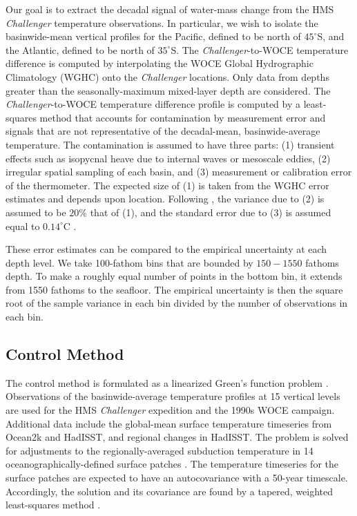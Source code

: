 \documentclass[12pt]{article}
\begin{document}
Our goal is to extract the decadal signal of water-mass change from
the HMS {\it Challenger} temperature observations. In particular, we
wish to isolate the basinwide-mean vertical profiles for the Pacific, defined to be north of $45^\circ$S, and the Atlantic, defined to be north of
$35^\circ$S. The {\it Challenger}-to-WOCE temperature difference is
computed by interpolating the WOCE Global Hydrographic Climatology
(WGHC)\cite{Gouretski-Koltermann-2004:WOCE} onto the {\it Challenger}
locations. Only data from depths greater than the seasonally-maximum mixed-layer depth are considered. The {\it Challenger}-to-WOCE temperature difference profile
is computed by a least-squares method that accounts for contamination
by measurement error and signals that are not representative of the
decadal-mean, basinwide-average temperature. The contamination is
assumed to have three parts: (1) transient effects such as isopycnal
heave due to internal waves or mesoscale eddies, (2) irregular spatial
sampling of each basin, and (3) measurement or calibration error of
the thermometer.  The expected size of (1) is taken from the WGHC
error estimates and depends upon location.  Following
\cite{Huang--2015:Heaving}, the variance due to (2) is assumed to be
$20\%$ that of (1), and the standard error due to (3) is assumed
equal to $0.14^{\circ}$C \cite{Roemmich-Gould-2012:135}.

These error estimates can be compared to the empirical uncertainty at each depth level. We take 100-fathom bins that are bounded by $150-1550$ fathoms depth. To make a roughly equal number of points in the bottom bin, it extends from 1550 fathoms to the seafloor. The empirical uncertainty is then the square root of the sample variance in each bin divided by the number of observations in each bin.

\subsection{Control Method}

The control method is formulated as a linearized Green's function
problem \cite{Gebbie--2012:Tracer}. Observations of the
basinwide-average temperature profiles at 15 vertical levels are used
for the HMS {\it Challenger} expedition and the 1990s WOCE campaign.
Additional data include the global-mean surface temperature timeseries
from Ocean2k and HadISST, and regional changes in HadISST. The problem
is solved for adjustments to the regionally-averaged subduction
temperature in 14 oceanographically-defined surface patches
\cite{Gebbie-Huybers-2010:Total}. The temperature timeseries for the
surface patches are expected to have an autocovariance with a 50-year
timescale. Accordingly, the solution and its covariance are found by a
tapered, weighted least-squares method \cite{Wunsch--1996:Ocean}.
\end{document}
